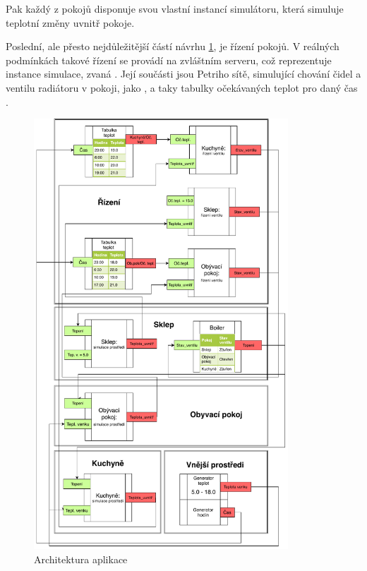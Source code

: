 Pak každý z pokojů disponuje svou vlastní instancí simulátoru, která simuluje teplotní změny uvnitř pokoje.

Poslední, ale přesto nejdůležitější částí návrhu \ref{boiler-net}, je řízení pokojů. V reálných podmínkách takové řízení se provádí na zvláštním serveru, což reprezentuje instance simulace, zvaná . Její součásti jsou Petriho sítě, simulující chování čidel a ventilu radiátoru v pokoji, jako , a taky tabulky očekávaných teplot pro daný čas .

\begin{figure}[htb]
 \centering
 \includegraphics[width=0.85\textwidth]{obrazky-figures/boiler-net.pdf}
 \caption{Architektura aplikace}
 \label{boiler-net}
\end{figure}

